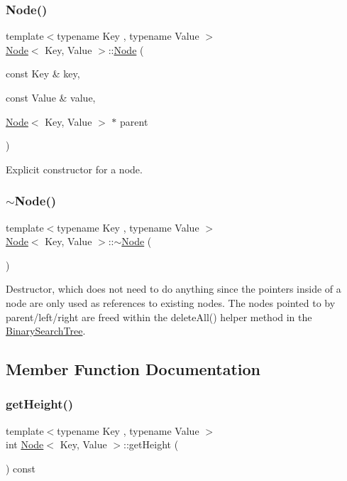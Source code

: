 \subsubsection{\texorpdfstring{Node()}{Node()}}
{\footnotesize\ttfamily template$<$typename Key , typename Value $>$ \\
\mbox{\hyperlink{classNode}{Node}}$<$ Key, Value $>$\+::\mbox{\hyperlink{classNode}{Node}} (\begin{DoxyParamCaption}\item[{const Key \&}]{key,  }\item[{const Value \&}]{value,  }\item[{\mbox{\hyperlink{classNode}{Node}}$<$ Key, Value $>$ $\ast$}]{parent }\end{DoxyParamCaption})}

Explicit constructor for a node. \mbox{\label{classNode_aaa753148a7bac7330974f1a9bc9249f1}} 
\subsubsection{\texorpdfstring{$\sim$\+Node()}{~Node()}}
{\footnotesize\ttfamily template$<$typename Key , typename Value $>$ \\
\mbox{\hyperlink{classNode}{Node}}$<$ Key, Value $>$\+::$\sim$\mbox{\hyperlink{classNode}{Node}} (\begin{DoxyParamCaption}{ }\end{DoxyParamCaption})\hspace{0.3cm}{\ttfamily [virtual]}}

Destructor, which does not need to do anything since the pointers inside of a node are only used as references to existing nodes. The nodes pointed to by parent/left/right are freed within the delete\+All() helper method in the \mbox{\hyperlink{classBinarySearchTree}{Binary\+Search\+Tree}}. 

\subsection{Member Function Documentation}
\mbox{\label{classNode_a42201a49f8c8bef979f79baa75d70109}} 
\subsubsection{\texorpdfstring{get\+Height()}{getHeight()}}
{\footnotesize\ttfamily template$<$typename Key , typename Value $>$ \\
int \mbox{\hyperlink{classNode}{Node}}$<$ Key, Value $>$\+::get\+Height (\begin{DoxyParamCaption}{ }\end{DoxyParamCaption}) const}

